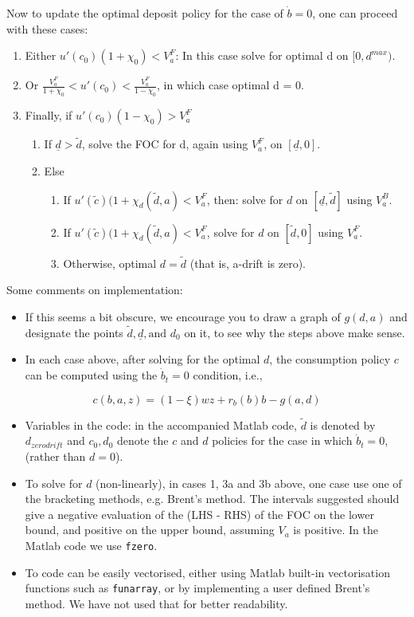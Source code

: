\documentclass[11pt]{article}
\begin{document}
Now to update the optimal deposit policy for the case of \(\dot{b}=0\), one can proceed with these cases:
\begin{enumerate}
\item Either \(u'(c_0)(1+\chi_0) < V_a^{F}\): In this case solve for optimal d on \([0,{d}^{max})\).
\item Or \(\frac{V_a^{F}}{1+\chi_0} < u'(c_0) < \frac{V_a^{F}}{1-\chi_0}\), in which case optimal d = 0.
\item Finally, if \(u'(c_0)(1-\chi_0) > V_a^{F}\)
\begin{enumerate}
\item If \(\underline{d} > \tilde{d}\), solve the FOC for d, again using \(V_a^F\), on \([\underline{d},0]\).
\item Else
\begin{enumerate}
\item If \(u'(\tilde{c})(1+\chi_d(\tilde{d},a) < V_a^F\), then: solve for \(d\) on \([ \underline{d}, \tilde{d} ]\) using \(V_a^B\).
\item If \(u'(\tilde{c})(1+\chi_d(\tilde{d},a) < V_a^F\), solve for \(d\) on \([ \tilde{d}, 0]\) using \(V_a^F\).
\item Otherwise, optimal \(d = \tilde{d}\) (that is, a-drift is zero).
\end{enumerate}
\end{enumerate}
\end{enumerate}

Some comments on implementation:
\begin{itemize}
\item If this seems a bit obscure, we encourage you to draw a graph of \(g(d,a)\) and designate the points \(\tilde{d}, \underline{d}, \text{and } d_0\) on it, to see why the steps above make sense.
\item In each case above, after solving for the optimal \(d\), the consumption policy \(c\) can be computed using the \(\dot{b}_t=0\) condition, i.e.,
\end{itemize}
\[c(b,a,z) = (1-\xi)wz +  r_b(b) b - g(a,d)\]
\begin{itemize}
\item Variables in the code: in the accompanied Matlab code, \(\tilde{d}\) is denoted by \(d_{zerodrift}\) and \(c_0, d_0\) denote the \(c\) and \(d\) policies for the case in which \(\dot{b}_t=0\), (rather than \(d=0\)).
\item To solve for \(d\) (non-linearly), in cases 1, 3a and 3b above, one case use one of the bracketing methods, e.g. Brent's method. The intervals suggested should give a negative evaluation of the (LHS - RHS) of the FOC on the lower bound, and positive on the upper bound, assuming \(V_a\) is positive. In the Matlab code we use \texttt{fzero}.
\item To code can be easily vectorised, either using Matlab built-in vectorisation functions such as \texttt{funarray}, or by implementing a user defined Brent's method. We have not used that for better readability.
\end{itemize}
\end{document}
